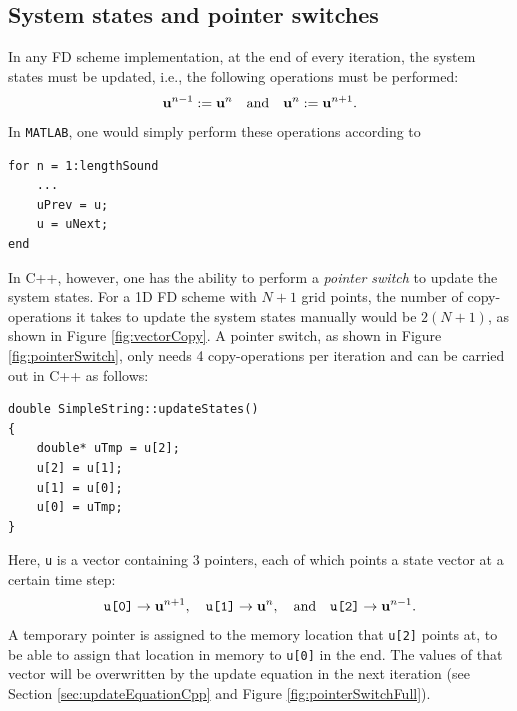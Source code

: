 \subsection{System states and pointer switches}\label{sec:pointerSwitch}
In any FD scheme implementation, at the end of every iteration, the system states must be updated, i.e., the following operations must be performed:
\begin{equation*}
    \mathbf{u}^{n-1} := \mathbf{u}^{n} \quad \text{and} \quad \mathbf{u}^{n} := \mathbf{u}^{n+1}.
\end{equation*}
In \texttt{MATLAB}, one would simply perform these operations according to

\setlstMAT
\begin{lstlisting}[belowskip=-0.5\baselineskip]
for n = 1:lengthSound
    ...
    uPrev = u;
    u = uNext;
end
\end{lstlisting}
In C++, however, one has the ability to perform a \textit{pointer switch} to update the system states. For a 1D FD scheme with $N+1$ grid points, the number of copy-operations it takes to update the system states manually would be $2(N+1)$, as shown in Figure \ref{fig:vectorCopy}. A pointer switch, as shown in Figure \ref{fig:pointerSwitch}, only needs 4 copy-operations per iteration and can be carried out in C++ as follows:

\setlstCpp
\begin{lstlisting}[belowskip=-0.5\baselineskip]
double SimpleString::updateStates()
{
    double* uTmp = u[2];
    u[2] = u[1];
    u[1] = u[0];
    u[0] = uTmp;
}
\end{lstlisting}
Here, \texttt{u} is a vector containing 3 pointers, each of which points a state vector at a certain time step: 
\begin{equation}
    \texttt{u[0]} \rightarrow \mathbf{u}^{n+1}, \quad \texttt{u[1]} \rightarrow \mathbf{u}^{n}, \quad \text{and} \quad \texttt{u[2]} \rightarrow \mathbf{u}^{n-1}.
\end{equation}
A temporary pointer is assigned to the memory location that \texttt{u[2]} points at, to be able to assign that location in memory to \texttt{u[0]} in the end. The values of that vector will be overwritten by the update equation in the next iteration (see Section \ref{sec:updateEquationCpp} and Figure \ref{fig:pointerSwitchFull}).

